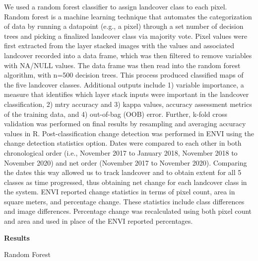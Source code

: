 \documentclass[
]{article}
\begin{document}
We used a random forest classifier to assign landcover class to each
pixel. Random forest is a machine learning technique that automates the
categorization of data by running a datapoint (e.g., a pixel) through a
set number of decision trees and picking a finalized landcover class via
majority vote. Pixel values were first extracted from the layer stacked
images with the values and associated landcover recorded into a data
frame, which was then filtered to remove variables with NA/NULL values.
The data frame was then read into the random forest algorithm, with
n=500 decision trees. This process produced classified maps of the five
landcover classes. Additional outputs include 1) variable importance, a
measure that identifies which layer stack inputs were important in the
landcover classification, 2) mtry accuracy and 3) kappa values, accuracy
assessment metrics of the training data, and 4) out-of-bag (OOB) error.
Further, k-fold cross validation was performed on final results by
resampling and averaging accuracy values in R. Post-classification
change detection was performed in ENVI using the change detection
statistics option. Dates were compared to each other in both
chronological order (i.e., November 2017 to January 2018, November 2018
to November 2020) and net order (November 2017 to November 2020).
Comparing the dates this way allowed us to track landcover and to obtain
extent for all 5 classes as time progressed, thus obtaining net change
for each landcover class in the system. ENVI reported change statistics
in terms of pixel count, area in square meters, and percentage change.
These statistics include class differences and image differences.
Percentage change was recalculated using both pixel count and area and
used in place of the ENVI reported percentages.

\textbf{Results}

Random Forest
\end{document}
